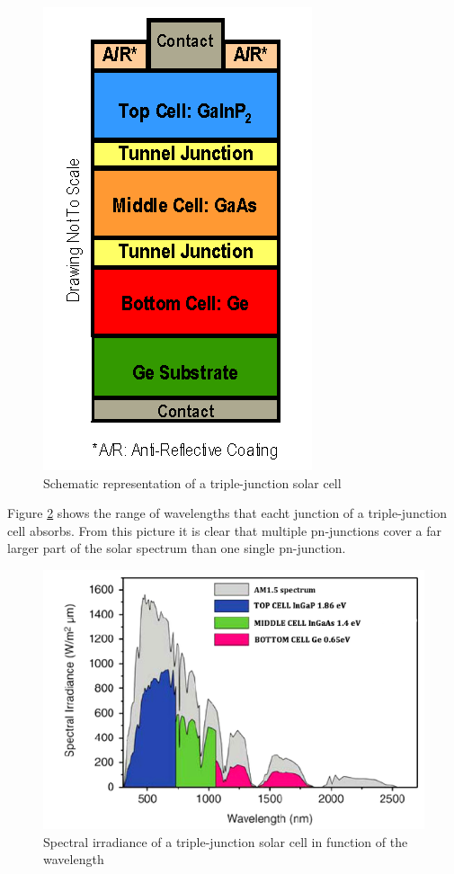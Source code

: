 \begin{figure}[H]
\centering
\includegraphics{chapters/img/multijunction_solar_cell.png}
\caption{Schematic representation of a triple-junction solar cell}
\label{fig:multij_cell}
\end{figure}

Figure \ref{multi_irradiance} \cite{yastrebova} shows the range of wavelengths that eacht junction of a triple-junction cell absorbs. From this picture it is clear that multiple pn-junctions cover a far larger part of the solar spectrum than one single pn-junction.

\begin{figure}[H]
\centering
\includegraphics{chapters/img/multijunction_spectral_irradiance.png}
\caption{Spectral irradiance of a triple-junction solar cell in function of the wavelength}
\label{multi_irradiance}
\end{figure}

